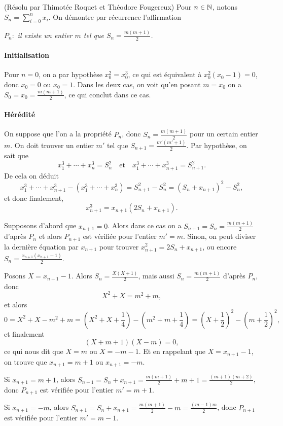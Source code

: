 \begin{sol}[82](R\'esolu par Thimot\'ee Roquet et Th\'eodore Fougereux)
Pour $n\in\mathbb{N}$, notons $S_n=\sum_{i=0}^n x_i$. On d\'emontre par r\'ecurrence l'affirmation
\begin{center}
$P_n:$ {\it il existe un entier $m$ tel que $S_n=\frac{m(m+1)}{2}$.}
\end{center} 

\paragraph*{Initialisation} Pour $n=0$, on a par hypoth\`ese $x_0^2=x_0^3$, ce qui est \'equivalent \`a $x_0^2(x_0-1)=0$, donc $x_0=0$ ou $x_0=1$. Dans les deux cas, on voit qu'en posant $m=x_0$ on a $S_0=x_0=\frac{m(m+1)}{2}$, ce qui conclut dans ce cas.

\paragraph*{H\'er\'edit\'e} On suppose que l'on a la propri\'et\'e $P_n$, donc $S_n=\frac{m(m+1)}{2}$ pour un certain entier $m$. On doit trouver un entier $m'$ tel que $S_{n+1}=\frac{m'(m'+1)}{2}$. Par hypoth\`ese, on sait que
\[x_1^3+\cdots+x_n^3=S_n^2\quad\text{et}\quad x_1^3+\cdots+x_{n+1}^3=S_{n+1}^2.\]
De cela on d\'eduit
\[x_1^3+\cdots+x_{n+1}^3-(x_1^3+\cdots+x_{n}^3)=S_{n+1}^2-S_n^2=(S_n+x_{n+1})^2-S_n^2,\]
et donc finalement,
\[x_{n+1}^3=x_{n+1}(2S_n+x_{n+1}).\]

Supposons d'abord que $x_{n+1}=0$. Alors dans ce cas on a $S_{n+1}=S_n=\frac{m(m+1)}{2}$ d'apr\`es $P_n$ et alors $P_{n+1}$ est v\'erifi\'ee pour l'entier $m'=m$. Sinon, on peut diviser la derni\`ere \'equation par $x_{n+1}$ pour trouver $x_{n+1}^2=2S_n+x_{n+1}$, ou encore $S_n=\frac{x_{n+1}(x_{n+1}-1)}{2}$.

Posons $X=x_{n+1}-1$. Alors $S_n=\frac{X(X+1)}{2}$, mais aussi $S_n=\frac{m(m+1)}{2}$ d'apr\`es  $P_n$, donc \[X^2+X=m^2+m,\]
et alors
\[0=X^2+X -m^2+m=\left(X^2+X+\frac14\right) -\left(m^2+m+\frac14\right)=\left(X+\frac12\right)^2-\left(m+\frac12\right)^2,\]
et finalement
\[(X+m+1)(X-m)=0,\]
ce qui nous dit que $X=m$ ou $X=-m-1$. Et en rappelant que $X=x_{n+1}-1$, on trouve que $x_{n+1}=m+1$ ou $x_{n+1}=-m$.

Si $x_{n+1}=m+1$, alors $S_{n+1}=S_n+x_{n+1}=\frac{m(m+1)}{2}+m+1=\frac{(m+1)(m+2)}{2}$, donc $P_{n+1}$ est v\'erifi\'ee pour l'entier $m'=m+1$.

Si $x_{n+1}=-m$, alors $S_{n+1}=S_n+x_{n+1}=\frac{m(m+1)}{2}-m=\frac{(m-1)m}{2}$, donc $P_{n+1}$ est v\'erifi\'ee pour l'entier $m'=m-1$.

\end{sol}

